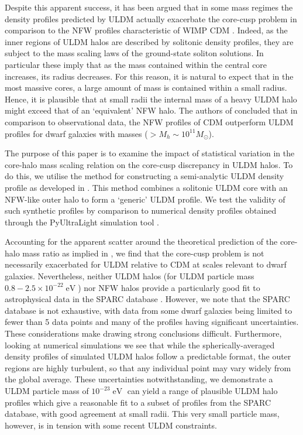 \documentclass[a4paper,11pt]{article}
\begin{document}
Despite this apparent success, it has  been argued that in some mass regimes the density profiles predicted by ULDM actually exacerbate the core-cusp problem in comparison to the NFW profiles characteristic of WIMP CDM \cite{Robles:2018fur}. Indeed, as the inner regions of ULDM halos are described by solitonic density profiles, they are subject to the mass scaling laws of the ground-state soliton solutions. In particular these imply that as the mass contained within the central core increases, its radius decreases. For this reason, it is natural to expect that in the most massive cores, a large amount of mass is contained within a small radius. Hence, it is plausible that at small radii the internal mass of a heavy ULDM halo might exceed that of an `equivalent' NFW halo. The authors of \cite{Robles:2018fur} concluded that in comparison to observational data, the NFW profiles of CDM outperform ULDM profiles for dwarf galaxies with masses ($> M_h \sim 10^{11} M_{\odot}$). 

The purpose of this paper is to examine the impact of statistical variation in the core-halo mass scaling relation on the core-cusp discrepancy in ULDM halos. To do this, we utilise the method for constructing a semi-analytic ULDM density profile as developed in \cite{Robles:2018fur}. This method combines a solitonic ULDM core with an NFW-like outer halo to form a `generic' ULDM profile. We test the validity of such synthetic profiles by comparison to numerical density profiles obtained through the PyUltraLight simulation tool \cite{Edwards:2018ccc}.

Accounting for the apparent scatter around the theoretical prediction of the core-halo mass ratio as implied in \cite{Schive:2014hza}, we find that the core-cusp problem is not necessarily exacerbated for ULDM relative to CDM at scales relevant to dwarf galaxies. Nevertheless,  neither ULDM halos (for ULDM particle mass $0.8-2.5\times 10^{-22} \operatorname{eV}$)
nor NFW halos provide a particularly good fit to astrophysical data in the SPARC database \cite{Lelli:2016zqa}. However, we note that the SPARC database is not exhaustive, with data from some dwarf galaxies being limited to fewer than 5 data points and many of the profiles having significant uncertainties. These considerations make drawing strong conclusions difficult. Furthermore, looking at numerical simulations we see that while the spherically-averaged density profiles of simulated ULDM halos follow a predictable format, the outer regions are highly turbulent, so that any individual point may vary widely from the global average. These uncertainties notwithstanding, we demonstrate a ULDM particle mass of $10^{-23}\operatorname{eV}$ can yield a range of plausible ULDM halo profiles which give a reasonable fit to a subset of profiles from the SPARC database, with good agreement at small radii. This very small particle mass, however, is in tension with some recent ULDM constraints. 
\end{document}
